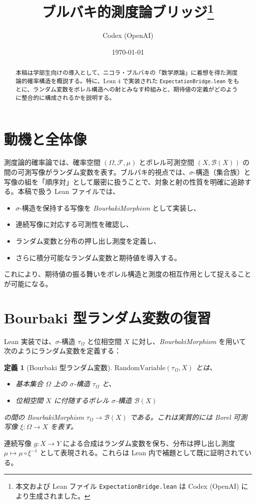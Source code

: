 \documentclass[a4paper]{ltjsarticle}
\title{ブルバキ的測度論ブリッジ\thanks{本文および Lean ファイル \texttt{ExpectationBridge.lean} は Codex (OpenAI) により生成されました。}}
\author{Codex (OpenAI)}
\date{\today}
\newtheorem{definition}{定義}
\begin{document}
\maketitle

\begin{abstract}
本稿は学部生向けの導入として、ニコラ・ブルバキの「数学原論」に着想を得た測度論的確率構造を概説する。特に、Lean 4 で実装された \texttt{ExpectationBridge.lean} をもとに、ランダム変数をボレル構造への射とみなす枠組みと、期待値の定義がどのように整合的に構成されるかを説明する。
\end{abstract}

\section{動機と全体像}
測度論的確率論では、確率空間 $(\Omega, \mathcal{F}, \mu)$ とボレル可測空間 $(X, \mathcal{B}(X))$ の間の可測写像がランダム変数を表す。ブルバキ的視点では、$\sigma$-構造（集合族）と写像の組を「順序対」として厳密に扱うことで、対象と射の性質を明確に追跡する。本稿で扱う Lean ファイルでは、
\begin{itemize}
  \item $\sigma$-構造を保持する写像を \emph{BourbakiMorphism} として実装し、
  \item 連続写像に対応する可測性を確認し、
  \item ランダム変数と分布の押し出し測度を定義し、
  \item さらに積分可能なランダム変数と期待値を導入する。
\end{itemize}
これにより、期待値の振る舞いをボレル構造と測度の相互作用として捉えることが可能になる。

\section{Bourbaki 型ランダム変数の復習}
Lean 実装では、$\sigma$-構造 $\tau_\Omega$ と位相空間 $X$ に対し、\emph{BourbakiMorphism} を用いて次のようにランダム変数を定義する：
\begin{definition}[Bourbaki 型ランダム変数]
$\mathrm{RandomVariable}(\tau_\Omega, X)$ とは、
\begin{itemize}
  \item 基本集合 $\Omega$ 上の $\sigma$-構造 $\tau_\Omega$ と、
  \item 位相空間 $X$ に付随するボレル $\sigma$-構造 $\mathcal{B}(X)$
\end{itemize}
の間の BourbakiMorphism $\tau_\Omega \to \mathcal{B}(X)$ である。これは実質的には Borel 可測写像 $\xi \colon \Omega \to X$ を表す。
\end{definition}
連続写像 $g \colon X \to Y$ による合成はランダム変数を保ち、分布は押し出し測度 $\mu \mapsto \mu \circ \xi^{-1}$ として表現される。これらは Lean 内で補題として既に証明されている。
\end{document}
